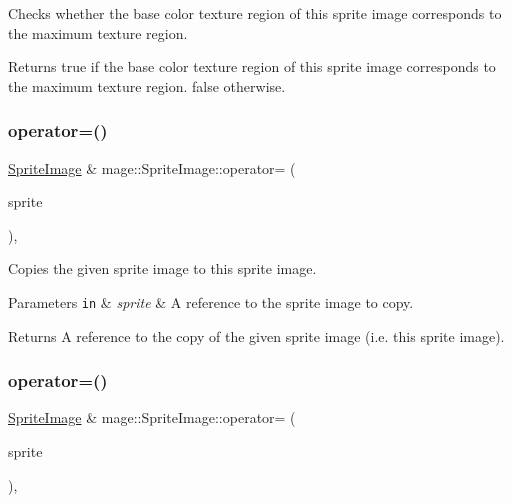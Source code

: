 Checks whether the base color texture region of this sprite image corresponds to the maximum texture region.

\begin{DoxyReturn}{Returns}
{\ttfamily true} if the base color texture region of this sprite image corresponds to the maximum texture region. {\ttfamily false} otherwise. 
\end{DoxyReturn}
\hypertarget{classmage_1_1_sprite_image_a7596ba158f703bb255e9ba3f20fb04bd}{}\label{classmage_1_1_sprite_image_a7596ba158f703bb255e9ba3f20fb04bd} 
\subsubsection{\texorpdfstring{operator=()}{operator=()}\hspace{0.1cm}{\footnotesize\ttfamily [1/2]}}
{\footnotesize\ttfamily \hyperlink{classmage_1_1_sprite_image}{Sprite\+Image} \& mage\+::\+Sprite\+Image\+::operator= (\begin{DoxyParamCaption}\item[{const \hyperlink{classmage_1_1_sprite_image}{Sprite\+Image} \&}]{sprite }\end{DoxyParamCaption})\hspace{0.3cm}{\ttfamily [default]}, {\ttfamily [noexcept]}}

Copies the given sprite image to this sprite image.


\begin{DoxyParams}[1]{Parameters}
\mbox{\tt in}  & {\em sprite} & A reference to the sprite image to copy. \\
\hline
\end{DoxyParams}
\begin{DoxyReturn}{Returns}
A reference to the copy of the given sprite image (i.\+e. this sprite image). 
\end{DoxyReturn}
\hypertarget{classmage_1_1_sprite_image_a0938a287bb8c78373d60a89ecc880561}{}\label{classmage_1_1_sprite_image_a0938a287bb8c78373d60a89ecc880561} 
\subsubsection{\texorpdfstring{operator=()}{operator=()}\hspace{0.1cm}{\footnotesize\ttfamily [2/2]}}
{\footnotesize\ttfamily \hyperlink{classmage_1_1_sprite_image}{Sprite\+Image} \& mage\+::\+Sprite\+Image\+::operator= (\begin{DoxyParamCaption}\item[{\hyperlink{classmage_1_1_sprite_image}{Sprite\+Image} \&\&}]{sprite }\end{DoxyParamCaption})\hspace{0.3cm}{\ttfamily [default]}, {\ttfamily [noexcept]}}

